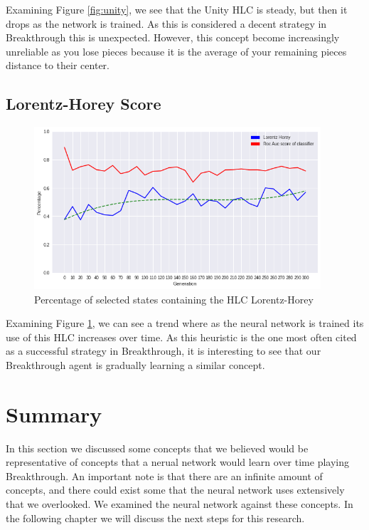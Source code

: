Examining Figure \ref{fig:unity}, we see that the Unity HLC is steady, but then it drops as the network is trained. As this is considered a decent strategy in Breakthrough this is unexpected. However, this concept become increasingly unreliable as you lose pieces because it is the average of your remaining pieces distance to their center. 

\subsection{Lorentz-Horey Score}

\begin{figure}[h]
    \begin{small}
        \begin{center}
            \includegraphics[width=0.95\textwidth]{graphics/lorentz_horey_trend.png}
        \end{center}
        \caption{Percentage of selected states containing the HLC Lorentz-Horey}
        \label{fig:lorentzheuristic}
    \end{small}
\end{figure}

Examining Figure \ref{fig:lorentzheuristic}, we can see a trend where as the neural network is trained its use of this HLC increases over time. As this heuristic is the one most often cited as a successful strategy in Breakthrough, it is interesting to see that our Breakthrough agent is gradually learning a similar concept.

\section{Summary}

In this section we discussed some concepts that we believed would be representative of concepts that a nerual network would learn over time playing Breakthrough. An important note is that there are an infinite amount of concepts, and there could exist some that the neural network uses extensively that we overlooked. We examined the neural network against these concepts. In the following chapter we will discuss the next steps for this research.